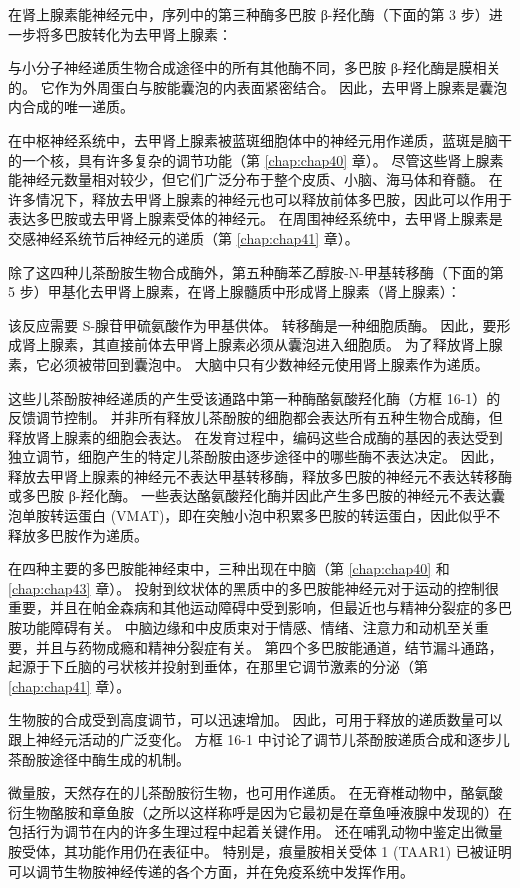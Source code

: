 在肾上腺素能神经元中，序列中的第三种酶多巴胺 β-羟化酶（下面的第 3 步）进一步将多巴胺转化为去甲肾上腺素：


与小分子神经递质生物合成途径中的所有其他酶不同，多巴胺 β-羟化酶是膜相关的。 
它作为外周蛋白与胺能囊泡的内表面紧密结合。 
因此，去甲肾上腺素是囊泡内合成的唯一递质。


在中枢神经系统中，去甲肾上腺素被蓝斑细胞体中的神经元用作递质，蓝斑是脑干的一个核，具有许多复杂的调节功能（第 \ref{chap:chap40} 章）。 
尽管这些肾上腺素能神经元数量相对较少，但它们广泛分布于整个皮质、小脑、海马体和脊髓。 
在许多情况下，释放去甲肾上腺素的神经元也可以释放前体多巴胺，因此可以作用于表达多巴胺或去甲肾上腺素受体的神经元。 
在周围神经系统中，去甲肾上腺素是交感神经系统节后神经元的递质（第 \ref{chap:chap41} 章）。


除了这四种儿茶酚胺生物合成酶外，第五种酶苯乙醇胺-N-甲基转移酶（下面的第 5 步）甲基化去甲肾上腺素，在肾上腺髓质中形成肾上腺素（肾上腺素）：


该反应需要 S-腺苷甲硫氨酸作为甲基供体。 
转移酶是一种细胞质酶。 
因此，要形成肾上腺素，其直接前体去甲肾上腺素必须从囊泡进入细胞质。 
为了释放肾上腺素，它必须被带回到囊泡中。 
大脑中只有少数神经元使用肾上腺素作为递质。


这些儿茶酚胺神经递质的产生受该通路中第一种酶酪氨酸羟化酶（方框 16-1）的反馈调节控制。 
并非所有释放儿茶酚胺的细胞都会表达所有五种生物合成酶，但释放肾上腺素的细胞会表达。 
在发育过程中，编码这些合成酶的基因的表达受到独立调节，细胞产生的特定儿茶酚胺由逐步途径中的哪些酶不表达决定。 
因此，释放去甲肾上腺素的神经元不表达甲基转移酶，释放多巴胺的神经元不表达转移酶或多巴胺 β-羟化酶。 
一些表达酪氨酸羟化酶并因此产生多巴胺的神经元不表达囊泡单胺转运蛋白 (VMAT)，即在突触小泡中积累多巴胺的转运蛋白，因此似乎不释放多巴胺作为递质。


在四种主要的多巴胺能神经束中，三种出现在中脑（第 \ref{chap:chap40} 和 \ref{chap:chap43} 章）。 
投射到纹状体的黑质中的多巴胺能神经元对于运动的控制很重要，并且在帕金森病和其他运动障碍中受到影响，但最近也与精神分裂症的多巴胺功能障碍有关。 
中脑边缘和中皮质束对于情感、情绪、注意力和动机至关重要，并且与药物成瘾和精神分裂症有关。 
第四个多巴胺能通道，结节漏斗通路，起源于下丘脑的弓状核并投射到垂体，在那里它调节激素的分泌（第 \ref{chap:chap41} 章）。


生物胺的合成受到高度调节，可以迅速增加。 
因此，可用于释放的递质数量可以跟上神经元活动的广泛变化。 
方框 16-1 中讨论了调节儿茶酚胺递质合成和逐步儿茶酚胺途径中酶生成的机制。


微量胺，天然存在的儿茶酚胺衍生物，也可用作递质。 
在无脊椎动物中，酪氨酸衍生物酪胺和章鱼胺（之所以这样称呼是因为它最初是在章鱼唾液腺中发现的）在包括行为调节在内的许多生理过程中起着关键作用。 
还在哺乳动物中鉴定出微量胺受体，其功能作用仍在表征中。 
特别是，痕量胺相关受体 1 (TAAR1) 已被证明可以调节生物胺神经传递的各个方面，并在免疫系统中发挥作用。


